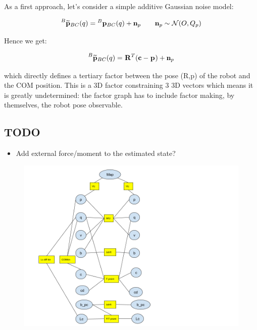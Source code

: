 \documentclass[11pt]{article}
\newcommand{\Rot}[2]{\prescript{#1}{}{\bfR}_{#2}}
\newcommand{\noise}{\bfn}
\newcommand{\posi}[2]{\prescript{#1}{}{\bfp}_{#2}}
\newcommand{\posim}[2]{\prescript{#1}{}{\widetilde{\bfp}}_{#2}}
\newcommand{\COM}{\bfc}
\newcommand{\Gaussian}[2]{\mathcal{N}({#1},{#2})}
\begin{document}
As a first approach, let's consider a simple additive Gaussian noise model:

\begin{equation}
    \posim{B}{BC}(q) = \posi{B}{BC}(q) + \noise_p ~~~~~~ \noise_p \sim \Gaussian{O}{Q_p}
\end{equation}

Hence we get:

\begin{equation}
    \posim{B}{BC}(q) = \Rot{}{}^T(\COM - \posi{}{}) + \noise_p
\end{equation}

which directly defines a tertiary factor between the pose (R,p) of the robot and the COM position. This is a 3D factor constraining 3 3D vectors which means it is greatly undetermined: the factor graph has to include factor making, by themselves, the robot pose observable.



\subsection{TODO}
\begin{itemize}
    \item Add external force/moment to the estimated state? 
\end{itemize}


\begin{figure}[ht]
    \centering
    \includegraphics[width=1\linewidth]{HumanoidStateFactorGraph.png}
    \label{fig:my_label}
\end{figure}
\end{document}
